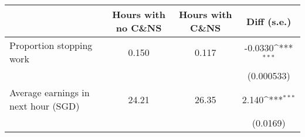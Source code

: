 {
\def\sym#1{\ifmmode^{#1}\else\(^{#1}\)\fi}
\begin{tabular}{l*{1}{ccc}}
\toprule
                    &\multicolumn{1}{m{2cm}}{\centering Hours with no C\&NS}&\multicolumn{1}{m{2cm}}{\centering Hours with C\&NS}&\multicolumn{1}{m{2cm}}{\centering Diff (s.e.)}         \\
\midrule
Proportion stopping work&       0.150&       0.117&     -0.0330\sym{***}\\
                    &            &            &  (0.000533)         \\
Average earnings in next hour (SGD)&       24.21&       26.35&       2.140\sym{***}\\
                    &            &            &    (0.0169)         \\
\bottomrule
\end{tabular}
}
